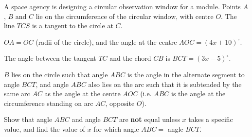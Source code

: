 \begin{question}
\noindent A space agency is designing a circular observation window for a module. Points $A$, $B$ and $C$ lie on the circumference of the circular window, with centre $O$. The line $TCS$ is a tangent to the circle at $C$.

$OA = OC$ (radii of the circle), and the angle at the centre $AOC = (4x + 10)^\circ$.

The angle between the tangent $TC$ and the chord $CB$ is $BCT = (3x - 5)^\circ$.

$B$ lies on the circle such that angle $ABC$ is the angle in the alternate segment to angle $BCT$, and angle $ABC$ also lies on the arc such that it is subtended by the same arc $AC$ as the angle at the centre $AOC$ (i.e. $ABC$ is the angle at the circumference standing on arc $AC$, opposite $O$).

\begin{center}
\end{center}

\noindent Show that angle $ABC$ and angle $BCT$ are \textbf{not} equal unless $x$ takes a specific value, and find the value of $x$ for which angle $ABC =$ angle $BCT$.

\vspace{4cm}

\begin{flushright}
\end{flushright}
\end{question}
